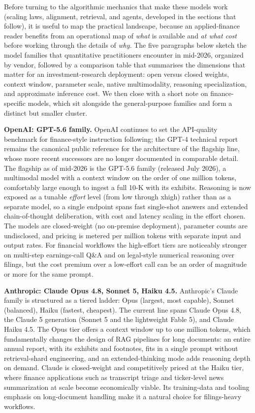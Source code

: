 Before turning to the algorithmic mechanics that make these models work (scaling laws, alignment, retrieval, and agents, developed in the sections that follow), it is useful to map the practical landscape, because an applied-finance reader benefits from an operational map of \textit{what} is available and \textit{at what cost} before working through the details of \textit{why}. The five paragraphs below sketch the model families that quantitative practitioners encounter in mid-2026, organized by vendor, followed by a comparison table that summarises the dimensions that matter for an investment-research deployment: open versus closed weights, context window, parameter scale, native multimodality, reasoning specialization, and approximate inference cost. We then close with a short note on finance-specific models, which sit alongside the general-purpose families and form a distinct but smaller cluster.

\textbf{OpenAI: GPT-5.6 family.} OpenAI continues to set the API-quality benchmark for finance-style instruction following; the GPT-4 technical report \citep{achiam2023gpt4} remains the canonical public reference for the architecture of the flagship line, whose more recent successors are no longer documented in comparable detail. The flagship as of mid-2026 is the GPT-5.6 family (released July 2026), a multimodal model with a context window on the order of one million tokens, comfortably large enough to ingest a full 10-K with its exhibits. Reasoning is now exposed as a tunable \textit{effort} level (from low through xhigh) rather than as a separate model, so a single endpoint spans fast single-shot answers and extended chain-of-thought deliberation, with cost and latency scaling in the effort chosen. The models are closed-weight (no on-premise deployment), parameter counts are undisclosed, and pricing is metered per million tokens with separate input and output rates. For financial workflows the high-effort tiers are noticeably stronger on multi-step earnings-call Q\&A and on legal-style numerical reasoning over filings, but the cost premium over a low-effort call can be an order of magnitude or more for the same prompt.

\textbf{Anthropic: Claude Opus 4.8, Sonnet 5, Haiku 4.5.} Anthropic's Claude family is structured as a tiered ladder: Opus (largest, most capable), Sonnet (balanced), Haiku (fastest, cheapest). The current line spans Claude Opus 4.8, the Claude 5 generation (Sonnet 5 and the lightweight Fable 5), and Claude Haiku 4.5. The Opus tier offers a context window up to one million tokens, which fundamentally changes the design of RAG pipelines for long documents: an entire annual report, with its exhibits and footnotes, fits in a single prompt without retrieval-shard engineering, and an extended-thinking mode adds reasoning depth on demand. Claude is closed-weight and competitively priced at the Haiku tier, where finance applications such as transcript triage and ticker-level news summarization at scale become economically viable. Its training-data and tooling emphasis on long-document handling make it a natural choice for filings-heavy workflows.

